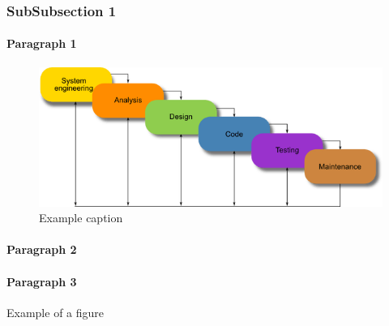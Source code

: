 \documentclass[a4paper, 11pt]{article} %
\begin{document}
\subsubsection{SubSubsection 1}
\lipsum[1] %

\paragraph{Paragraph 1}
\lipsum[2]

	\begin{figure}[H]
	\centering
	\includegraphics[scale=0.5]{waterfall-model}
	\caption{Example caption}
	\label{fig:Ng1} 
\end{figure}


\paragraph{Paragraph 2}
\lipsum[2]
\paragraph{Paragraph 3}
\lipsum[2]
\pagebreak
Example of a figure








%
\end{document}
